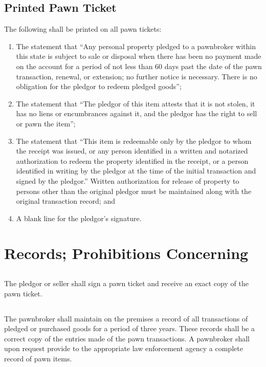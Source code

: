\subsection{Printed Pawn Ticket}
The following shall be printed on all pawn tickets:
\begin{enumerate}[{\indent}1)]
    \item The statement that “Any personal property pledged to a pawnbroker within this state is subject to sale or disposal when there has been no payment made on the account for a period of not less than 60 days past the date of the pawn transaction, renewal, or extension; no further notice is necessary.  There is no obligation for the pledgor to redeem pledged goods”;
    \item The statement that “The pledgor of this item attests that it is not stolen, it has no liens or encumbrances against it, and the pledgor has the right to sell or pawn the item”;
    \item The statement that “This item is redeemable only by the pledgor to whom the receipt was issued, or any person identified in a written and notarized authorization to redeem the property identified in the receipt, or a person identified in writing by the pledgor at the time of the initial transaction and signed by the pledgor.” Written authorization for release of property to persons other than the original pledgor must be maintained along with the original transaction record; and
    \item A blank line for the pledgor’s signature.
\end{enumerate}

\section{Records; Prohibitions Concerning}
\subsection{}
The pledgor or seller shall sign a pawn ticket and receive an exact copy of the pawn ticket.
\subsection{}
The pawnbroker shall maintain on the premises a record of all transactions of pledged or purchased goods for a period of three years.  These records shall be a correct copy of the entries made of the pawn transactions.  A pawnbroker shall upon request provide to the appropriate law enforcement agency a complete record of pawn items.
